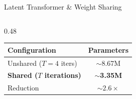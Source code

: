 \documentclass[aspectratio=169,11pt]{beamer}
\begin{document}
\begin{frame}[shrink=5]{Latent Transformer \& Weight Sharing}
\begin{columns}[T]
\begin{column}{0.48\textwidth}
      \vspace{0.3em}
      \begin{table}
        \centering\scriptsize
        \begin{tabular}{lc}
          \toprule
          \textbf{Configuration} & \textbf{Parameters} \\
          \midrule
          Unshared ($T\!=\!4$ iters) & $\sim$8.67M \\
          \textbf{Shared ($T$ iterations)} & \textbf{$\sim$3.35M} \\
          \midrule
          Reduction & \alert{$\sim\!2.6\times$} \\
          \bottomrule
        \end{tabular}
      \end{table}
    \end{column}
  \end{columns}
\end{frame}
\end{document}
